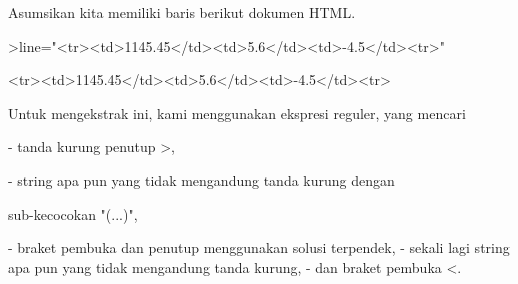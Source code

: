\documentclass[a4paper,10pt]{article}
\begin{document}
\begin{eulernotebook}
\begin{eulercomment}
\begin{eulercomment}
\begin{eulercomment}
\begin{eulercomment}
\begin{eulercomment}
\begin{eulercomment}
\begin{eulercomment}
Asumsikan kita memiliki baris berikut dokumen HTML.
\end{eulercomment}
\begin{eulerprompt}
>line="<tr><td>1145.45</td><td>5.6</td><td>-4.5</td><tr>"
\end{eulerprompt}
\begin{euleroutput}
  <tr><td>1145.45</td><td>5.6</td><td>-4.5</td><tr>
\end{euleroutput}
\begin{eulercomment}
Untuk mengekstrak ini, kami menggunakan ekspresi reguler, yang mencari

- tanda kurung penutup \textgreater{},\\
\end{eulercomment}
\begin{eulerttcomment}
 - string apa pun yang tidak mengandung tanda kurung dengan
\end{eulerttcomment}
\begin{eulercomment}
sub-kecocokan "(...)",\\
\end{eulercomment}
\begin{eulerttcomment}
 - braket pembuka dan penutup menggunakan solusi terpendek,
 - sekali lagi string apa pun yang tidak mengandung tanda kurung,
 - dan braket pembuka <.
\end{eulerttcomment}
\begin{eulercomment}


\end{eulercomment}
\end{eulercomment}
\end{eulercomment}
\end{eulercomment}
\end{eulercomment}
\end{eulercomment}
\end{eulercomment}
\end{eulernotebook}
\end{document}
